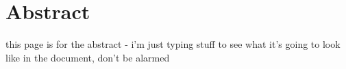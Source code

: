 \vspace*{\fill}

\section*{\centering Abstract}

\begin{center}

this page is for the abstract - i'm just typing stuff to see what it's going to look like in the document, don't be alarmed

\end{center}

\vfill
